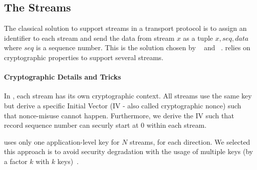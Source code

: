 
\subsection{The \tcpls Streams}\label{sec:datastreams}
The classical solution to support streams in a transport protocol is to assign
an identifier to each stream and send the data from stream $x$ as a tuple
$x,seq,data$ where $seq$ is a sequence number. This is the solution chosen by
\sctp~\cite{rfc4960} and \quic~\cite{draft-ietf-quic-transport}. \tcpls relies
on cryptographic properties to support several streams.

\paragraph*{Cryptographic Details and Tricks} In \tcpls, each stream has its own
cryptographic context. All streams use the same key but derive a specific
Initial Vector (IV - also called cryptographic nonce) such that nonce-misuse
cannot happen. Furthermore, we derive the IV such that \tcpls record sequence
number can securly start at $0$ within each stream.

\tcpls uses only one application-level key for $N$ streams, for each direction.
We selected this approach is to avoid security degradation with the usage of
multiple keys (by a factor $k$ with $k$ keys)~\cite{chatterjee2011another}.

